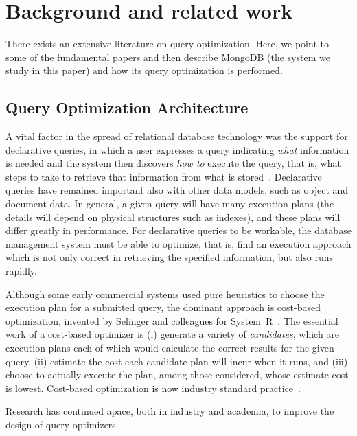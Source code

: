 \section{Background and related work}
\label{sec:background}
There exists an extensive literature on query
optimization. Here, we point to some of the fundamental papers and then describe MongoDB (the system we study in this paper) and how its \approachName query optimization is performed.




\subsection{Query Optimization Architecture}

A vital factor in the spread of relational database technology was the support for declarative queries, in which a user expresses a query indicating {\it what} information is needed and the system then discovers {\it how to} execute the query, that is, what steps to take to retrieve that information from what is stored~\cite{Codd70}. Declarative queries have remained important also with other data models, such as object and document data. In general, a given query will have many execution plans (the details will depend on physical structures such as indexes), and these plans will differ greatly in performance. For declarative queries to be workable, the database management system must be able to optimize, that is, find an execution approach which is not only correct in retrieving the specified information, but also runs rapidly.

Although some early commercial systems used pure heuristics to choose the execution plan for a submitted query, the dominant approach is cost-based optimization, invented by Selinger and colleagues for System~R~\cite{SelingerACLP79}. The essential work of a cost-based optimizer is (i) generate a variety of \emph{candidates}, which are execution plans each of which would calculate the correct results for the given query, (ii) estimate the cost each candidate plan will incur when it runs, and (iii) choose to actually execute the plan, among those considered, whose estimate cost is lowest. Cost-based optimization is now industry standard practice~\cite{lahdenmaki2005relational}.

Research has continued apace, both in industry and academia, to improve the design of query optimizers.


